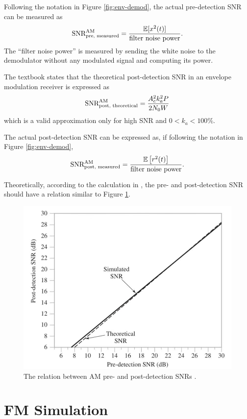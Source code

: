 \documentclass[../ECE459FinalProjectReport.tex]{subfiles}
\begin{document}
Following the notation in Figure \ref{fig:env-demod}, the actual pre-detection SNR can be measured as
\begin{equation}
    \text{SNR}_{\text{pre, measured}}^{\text{AM}} = \frac{\mathbb{E}[x^2(t)]}{\text{filter noise power}}.
\end{equation}
The ``filter noise power'' is measured by sending the white noise to the demodulator without any modulated signal and computing its power.

The textbook \cite[Eq. (9.23)]{haykinIntroductionAnalogDigital2007} states that the theoretical post-detection SNR in an envelope modulation receiver is expressed as
\begin{equation}
    \text{SNR}_{\text{post, theoretical}}^{\text{AM}} = \frac{A_c^2 k_a^2 P}{2N_0 W}
\end{equation}
which is a valid approximation only for high SNR and $0<k_a<100\%$.

The actual post-detection SNR can be expressed as, if following the notation in Figure \ref{fig:env-demod},
\begin{equation}
    \text{SNR}_{\text{post, measured}}^{\text{AM}} = \frac{\mathbb{E}\left[r^2(t)\right]}{\text{filter noise power}}.
\end{equation}

Theoretically, according to the calculation in \cite[Sec. 9.7]{haykinIntroductionAnalogDigital2007}, the pre- and post-detection SNR should have a relation similar to Figure \ref{fig:am-snr-theo}.
\begin{figure}[tb]
    \centering
    \includegraphics[width=0.5\linewidth]{plots/am_snr.jpg}
    \caption{The relation between AM pre- and post-detection SNRs \cite[Fig. 9.12]{haykinIntroductionAnalogDigital2007}.}
    \label{fig:am-snr-theo}
\end{figure}

\section{FM Simulation}
\end{document}
